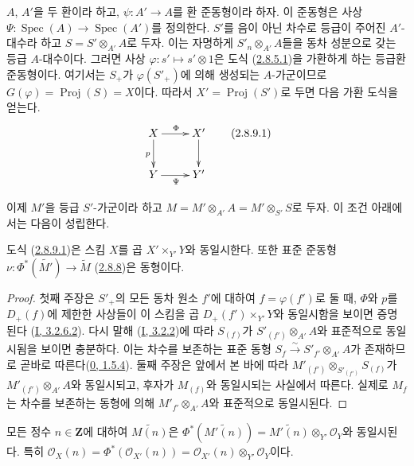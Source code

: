 \begin{env}[2.8.9]
\label{II.2.8.9-ko}
$A$, $A'$을 두 환이라 하고, $\psi:A'\to A$를 환 준동형이라 하자. 이
준동형은 사상
$\Psi:\operatorname{Spec}(A)\to\operatorname{Spec}(A')$를 정의한다.
$S'$를 음이 아닌 차수로 등급이 주어진 $A'$-대수라 하고
$S=S'\otimes_{A'}A$로 두자. 이는 자명하게 $S'_n\otimes_{A'}A$들을
동차 성분으로 갖는 등급 $A$-대수이다. 그러면 사상
$\varphi:s'\mapsto s'\otimes1$은 도식
(\hyperref[II.2.8.5.1-ko]{2.8.5.1})을 가환하게 하는 등급환
준동형이다. 여기서는 $S_+$가 $\varphi(S'_+)$에 의해 생성되는
$A$-가군이므로 $G(\varphi)=\operatorname{Proj}(S)=X$이다. 따라서
$X'=\operatorname{Proj}(S')$로 두면 다음 가환 도식을 얻는다.
\[
\label{II.2.8.9.1-ko}
  \xymatrix{
    X\ar[r]^{\Phi}\ar[d]_p & X'\ar[d]\\
    Y\ar[r]_{\Psi} & Y'
  }
\tag{2.8.9.1}
\]

이제 $M'$을 등급 $S'$-가군이라 하고
$M=M'\otimes_{A'}A=M'\otimes_{S'}S$로 두자. 이 조건 아래에서는
다음이 성립한다.
\end{env}

\begin{proposition}[2.8.10]
\label{II.2.8.10-ko}
도식 (\hyperref[II.2.8.9.1-ko]{2.8.9.1})은 스킴 $X$를 곱
$X'\times_{Y'}Y$와 동일시한다. 또한 표준 준동형
$\nu:\Phi^*(\widetilde{M'})\to\widetilde{M}$
(\hyperref[II.2.8.8-ko]{2.8.8})은 동형이다.
\end{proposition}

\begin{proof}
첫째 주장은 $S'_+$의 모든 동차 원소 $f'$에 대하여
$f=\varphi(f')$로 둘 때, $\Phi$와 $p$를 $D_+(f)$에 제한한 사상들이
이 스킴을 곱 $D_+(f')\times_{Y'}Y$와 동일시함을 보이면 증명된다
(\hyperref[I.3.2.6.2-ko]{I, 3.2.6.2}). 다시 말해
(\hyperref[I.3.2.2-ko]{I, 3.2.2})에 따라 $S_{(f)}$가
$S'_{(f')}\otimes_{A'}A$와 표준적으로 동일시됨을 보이면 충분하다.
이는 차수를 보존하는 표준 동형
$S_f\xrightarrow{\sim}S'_{f'}\otimes_{A'}A$가 존재하므로 곧바로
따른다(\hyperref[0.1.5.4-ko]{0, 1.5.4}). 둘째 주장은 앞에서 본 바에
따라 $M'_{(f')}\otimes_{S'_{(f')}}S_{(f)}$가
$M'_{(f')}\otimes_{A'}A$와 동일시되고, 후자가 $M_{(f)}$와 동일시되는
사실에서 따른다. 실제로 $M_f$는 차수를 보존하는 동형에 의해
$M'_{f'}\otimes_{A'}A$와 표준적으로 동일시된다.
\end{proof}

\begin{corollary}[2.8.11]
\label{II.2.8.11-ko}
모든 정수 $n\in\mathbf{Z}$에 대하여 $\widetilde{M(n)}$은
$\Phi^*(\widetilde{M'(n)})
=\widetilde{M'(n)}\otimes_{Y'}\mathcal{O}_Y$와 동일시된다. 특히
$\mathcal{O}_X(n)=\Phi^*(\mathcal{O}_{X'}(n))
=\mathcal{O}_{X'}(n)\otimes_{Y'}\mathcal{O}_Y$이다.
\end{corollary}

